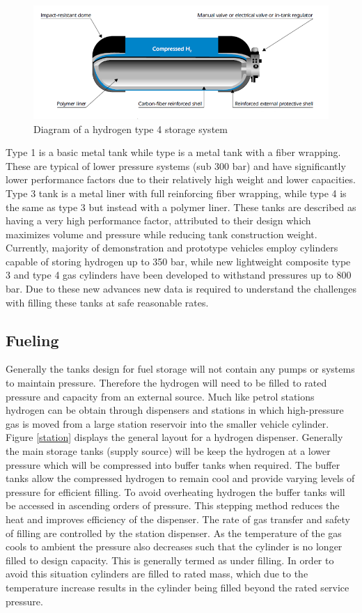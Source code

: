 \documentclass[paper=a4, fontsize=11pt, abstract=on]{scrartcl}
\numberwithin{equation}{section}		%
\numberwithin{figure}{section}			%
\numberwithin{table}{section}				%
\begin{document}
\begin{figure}[H]
\centering
\includegraphics[width=0.8\linewidth]{tank2}
\caption{Diagram of a hydrogen type 4 storage system}
\label{tank}
\end{figure}

 Type 1 is a basic metal tank while type is a metal tank with a fiber wrapping. These are typical of lower pressure systems (sub 300 bar) and have significantly lower performance factors due to their relatively high weight and lower capacities. Type 3 tank is a metal liner with full reinforcing fiber wrapping, while type 4 is the same as type 3 but instead with a polymer liner. These tanks are described as having a very high performance factor, attributed to their design which maximizes volume and pressure while reducing tank construction weight.  Currently, majority of demonstration and prototype vehicles employ cylinders capable of storing hydrogen up to 350 bar, while new lightweight composite type 3 and type 4 gas cylinders have been developed to withstand pressures up to 800 bar. Due to these new advances new data is required to understand the challenges with filling these tanks at safe reasonable rates.

\subsection{Fueling}
Generally the tanks design for fuel storage will not contain any pumps or systems to maintain pressure. Therefore the hydrogen will need to be filled to rated pressure and capacity from an external source. Much like petrol stations hydrogen can be obtain through dispensers and stations in which high-pressure gas is moved from a large station reservoir into the smaller vehicle cylinder. Figure \ref{station} displays the general layout for a hydrogen dispenser. Generally the main storage tanks (supply source) will be keep the hydrogen at a lower pressure which will be compressed into buffer tanks when required. The buffer tanks allow the compressed hydrogen to remain cool and provide varying levels of pressure for efficient filling. To avoid overheating hydrogen the buffer tanks will be accessed in ascending orders of pressure. This stepping method reduces the heat and improves efficiency of the dispenser. The rate of gas transfer and safety of filling are controlled by the station dispenser. As the temperature of the gas cools to ambient the pressure also decreases such that the cylinder is no longer filled to design capacity. This is generally termed as under filling. In order to avoid this situation cylinders are filled to rated mass, which due to the temperature increase results in the cylinder being filled beyond the rated service pressure. 
\end{document}
